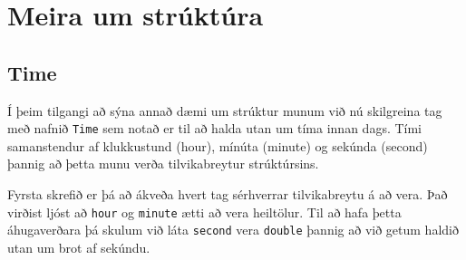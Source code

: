 





\chapter{Meira um strúktúra}
\label{time}

\section{Time}

Í þeim tilgangi að sýna annað dæmi um strúktur munum við nú skilgreina tag með nafnið {\tt Time} sem notað er til að halda utan um tíma innan dags.
Tími samanstendur af klukkustund (hour), mínúta (minute) og sekúnda (second) þannig að þetta munu verða tilvikabreytur strúktúrsins.

Fyrsta skrefið er þá að ákveða hvert tag sérhverrar tilvikabreytu á að vera.
Það virðist ljóst að {\tt hour} og {\tt minute} ætti að vera heiltölur.
Til að hafa þetta áhugaverðara þá skulum við láta {\tt second} vera {\tt double} þannig að við getum haldið utan um brot af sekúndu.

